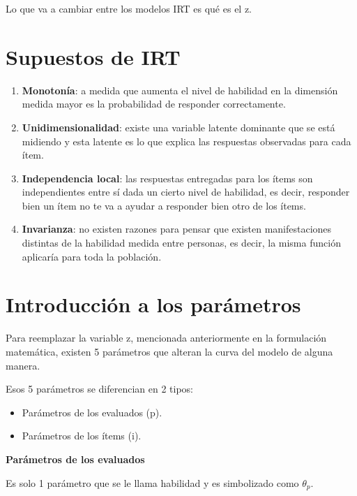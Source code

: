 \documentclass[
  letterpaper,
  DIV=11,
  numbers=noendperiod]{scrreprt}
\begin{document}
Lo que va a cambiar entre los modelos IRT es qué es el z.

\section{\texorpdfstring{\textbf{Supuestos de
IRT}}{Supuestos de IRT}}\label{supuestos-de-irt}

\begin{enumerate}
\def\labelenumi{\arabic{enumi}.}
\item
  \textbf{Monotonía}: a medida que aumenta el nivel de habilidad en la
  dimensión medida mayor es la probabilidad de responder correctamente.
\item
  \textbf{Unidimensionalidad}: existe una variable latente dominante que
  se está midiendo y esta latente es lo que explica las respuestas
  observadas para cada ítem.
\item
  \textbf{Independencia local}: las respuestas entregadas para los ítems
  son independientes entre sí dada un cierto nivel de habilidad, es
  decir, responder bien un ítem no te va a ayudar a responder bien otro
  de los ítems.
\item
  \textbf{Invarianza}: no existen razones para pensar que existen
  manifestaciones distintas de la habilidad medida entre personas, es
  decir, la misma función aplicaría para toda la población.
\end{enumerate}

\section{\texorpdfstring{\textbf{Introducción a los
parámetros}}{Introducción a los parámetros}}\label{introducciuxf3n-a-los-paruxe1metros}

Para reemplazar la variable z, mencionada anteriormente en la
formulación matemática, existen 5 parámetros que alteran la curva del
modelo de alguna manera.

Esos 5 parámetros se diferencian en 2 tipos:

\begin{itemize}
\item
  Parámetros de los evaluados (p).
\item
  Parámetros de los ítems (i).
\end{itemize}

\textbf{Parámetros de los evaluados}

Es solo 1 parámetro que se le llama habilidad y es simbolizado como
\(\theta_p\).
\end{document}
